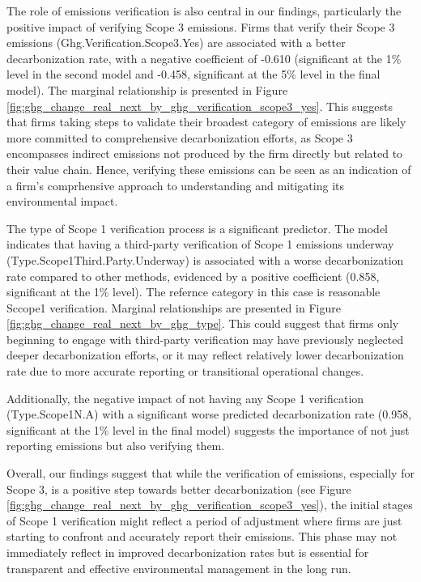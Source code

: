 The role of emissions verification is also central in our findings, particularly the positive impact of verifying Scope 3 emissions. Firms that verify their Scope 3 emissions (Ghg.Verification.Scope3.Yes) are associated with a better decarbonization rate, with a negative coefficient of -0.610 (significant at the 1\% level in the second model and -0.458, significant at the 5\% level in the final model). The marginal relationship is presented in Figure \ref{fig:ghg_change_real_next_by_ghg_verification_scope3_yes}. This suggests that firms taking steps to validate their broadest category of emissions are likely more committed to comprehensive decarbonization efforts, as Scope 3 encompasses indirect emissions not produced by the firm directly but related to their value chain. Hence, verifying these emissions can be seen as an indication of a firm's comprhensive approach to understanding and mitigating its environmental impact.


The type of Scope 1 verification process is a significant predictor. The model indicates that having a third-party verification of Scope 1 emissions underway (Type.Scope1Third.Party.Underway) is associated with a worse decarbonization rate compared to other methods, evidenced by a positive coefficient (0.858, significant at the 1\% level). The refernce category in this case is reasonable Sccope1 verification. Marginal relationships are presented in Figure \ref{fig:ghg_change_real_next_by_ghg_type}. This could suggest that firms only beginning to engage with third-party verification may have previously neglected deeper decarbonization efforts, or it may reflect relatively lower decarbonization rate due to more accurate reporting or transitional operational changes.
    

Additionally, the negative impact of not having any Scope 1 verification (Type.Scope1N.A) with a significant worse predicted decarbonization rate (0.958, significant at the 1\% level in the final model) suggests the importance of not just reporting emissions but also verifying them.


Overall, our findings suggest that while the verification of emissions, especially for Scope 3, is a positive step towards better decarbonization (see Figure \ref{fig:ghg_change_real_next_by_ghg_verification_scope3_yes}), the initial stages of Scope 1 verification might reflect a period of adjustment where firms are just starting to confront and accurately report their emissions. This phase may not immediately reflect in improved decarbonization rates but is essential for transparent and effective environmental management in the long run. 
    

